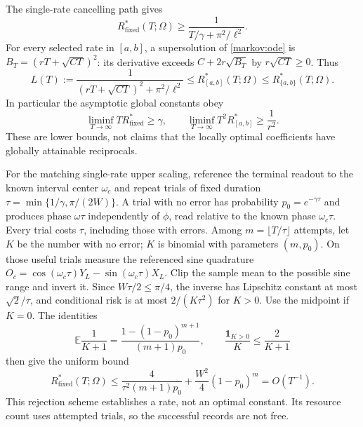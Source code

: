 \documentclass[11pt,a4paper]{article}
\numberwithin{equation}{section}
\theoremstyle{remark}
\begin{document}
The single-rate cancelling path gives
\begin{equation}
 R_{\mathrm{fixed}}^*(T;\Omega)\ge
 \frac1{T/\gamma+\pi^2/\ell^2}.
 \label{markov:globalfixedlower}
\end{equation}
For every selected rate in $[a,b]$, a supersolution of \eqref{markov:ode} is
$B_T=(rT+\sqrt{CT})^2$: its derivative exceeds
$C+2r\sqrt{B_T}$ by $r\sqrt{CT}\ge0$. Thus
\begin{equation}
 L(T):=\frac1{(rT+\sqrt{CT})^2+\pi^2/\ell^2}
 \le R_{[a,b]}^*(T;\Omega)\le R_{\{a,b\}}^*(T;\Omega).
 \label{markov:globalcontrollower}
\end{equation}
In particular the asymptotic global constants obey
\begin{equation}
 \liminf_{T\to\infty}T R_{\mathrm{fixed}}^*\ge\gamma,\qquad
 \liminf_{T\to\infty}T^2R_{[a,b]}^*\ge\frac1{r^2}.
\end{equation}
These are lower bounds, not claims that the locally optimal coefficients
have globally attainable reciprocals.

For the matching single-rate upper scaling, reference the terminal readout
to the known interval center $\omega_c$ and repeat trials of fixed duration
$\tau=\min\{1/\gamma,\pi/(2W)\}$.
A trial with no error has probability $p_0=e^{-\gamma\tau}$ and produces
phase $\omega\tau$ independently of $\phi$, read relative to the known
phase $\omega_c\tau$. Every trial costs
$\tau$, including those with errors. Among
$m=\lfloor T/\tau\rfloor$ attempts, let $K$ be the number with no error;
$K$ is binomial with parameters $(m,p_0)$. On those useful trials measure the
referenced sine quadrature
$O_c=\cos(\omega_c\tau)Y_L-\sin(\omega_c\tau)X_L$.
Clip the sample mean to the possible sine range and invert
it. Since $W\tau/2\le\pi/4$, the inverse has Lipschitz constant at most
$\sqrt2/\tau$, and conditional risk is at most $2/(K\tau^2)$ for $K>0$.
Use the midpoint if $K=0$. The identities
\begin{equation}
 \mathbb E\frac1{K+1}
 =\frac{1-(1-p_0)^{m+1}}{(m+1)p_0},\qquad
 \frac{\mathbf1_{K>0}}K\le\frac2{K+1}
\end{equation}
then give the uniform bound
\begin{equation}
 R_{\mathrm{fixed}}^*(T;\Omega)
 \le\frac4{\tau^2(m+1)p_0}
     +\frac{W^2}{4}(1-p_0)^m
 =O(T^{-1}).
\end{equation}
This rejection scheme establishes a rate, not an optimal constant. Its
resource count uses attempted trials, so the successful records are not free.
\end{document}
